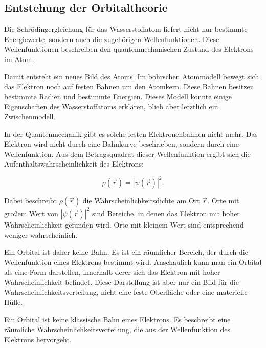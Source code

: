 \subsection{Entstehung der Orbitaltheorie}
\label{subsec:entstehung_orbitaltheorie}

Die Schrödingergleichung für das
Wasserstoffatom liefert nicht nur bestimmte
Energiewerte, sondern auch die zugehörigen Wellenfunktionen.
Diese Wellenfunktionen beschreiben den quantenmechanischen Zustand
 des Elektrons im Atom.

Damit entsteht ein neues Bild des Atoms. Im bohrschen Atommodell
 bewegt sich das Elektron noch auf festen Bahnen
 um den Atomkern. Diese Bahnen besitzen bestimmte
Radien und bestimmte Energien. Dieses Modell konnte einige Eigenschaften des
Wasserstoffatoms erklären, blieb aber letztlich ein Zwischenmodell.

In der Quantenmechanik gibt es solche festen Elektronenbahnen
 nicht mehr. Das Elektron wird nicht durch eine Bahnkurve
beschrieben, sondern durch eine Wellenfunktion. Aus dem Betragsquadrat dieser
Wellenfunktion ergibt sich die Aufenthaltswahrscheinlichkeit
 des Elektrons:

\begin{equation}
	\rho(\vec r) = |\psi(\vec r)|^2 .
	\label{eq:aufenthaltswahrscheinlichkeit_orbital}
\end{equation}

Dabei beschreibt \(\rho(\vec r)\) die
Wahrscheinlichkeitsdichte am Ort \(\vec r\). Orte mit großem Wert von
\(|\psi(\vec r)|^2\) sind Bereiche, in denen das Elektron mit hoher
Wahrscheinlichkeit gefunden wird. Orte mit kleinem Wert sind entsprechend
weniger wahrscheinlich.

Ein Orbital ist daher keine Bahn. Es ist ein
räumlicher Bereich, der durch die Wellenfunktion eines Elektrons bestimmt wird.
Anschaulich kann man ein Orbital als eine Form darstellen, innerhalb derer sich
das Elektron mit hoher Wahrscheinlichkeit befindet. Diese Darstellung ist aber
nur ein Bild für die Wahrscheinlichkeitsverteilung, nicht eine feste Oberfläche
oder eine materielle Hülle.
\FloatBarrier
\begin{PhysicsBox}
	\label{box:bedeutung_orbital}
	Ein Orbital ist keine klassische Bahn eines Elektrons. Es beschreibt eine
	räumliche Wahrscheinlichkeitsverteilung, die aus der Wellenfunktion des
	Elektrons hervorgeht.
\end{PhysicsBox}

